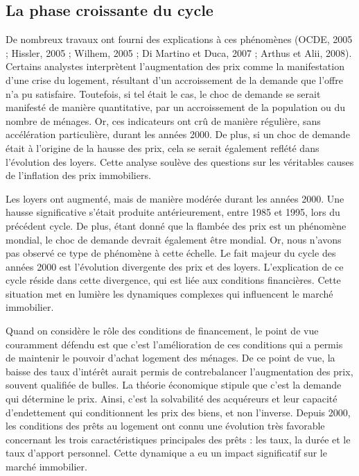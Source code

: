 \documentclass[a4paper, 12pt]{report}
\begin{document}
\subsection{La phase croissante du cycle}

De nombreux travaux ont fourni des explications à ces phénomènes (OCDE, 2005 ; Hissler, 2005 ; Wilhem, 2005 ; Di Martino et Duca, 2007 ; Arthus et Alii, 2008). Certains analystes interprètent l'augmentation des prix comme la manifestation d'une crise du logement, résultant d'un accroissement de la demande que l'offre n'a pu satisfaire. Toutefois, si tel était le cas, le choc de demande se serait manifesté de manière quantitative, par un accroissement de la population ou du nombre de ménages. Or, ces indicateurs ont crû de manière régulière, sans accélération particulière, durant les années 2000. De plus, si un choc de demande était à l'origine de la hausse des prix, cela se serait également reflété dans l'évolution des loyers. Cette analyse soulève des questions sur les véritables causes de l'inflation des prix immobiliers.

Les loyers ont augmenté, mais de manière modérée durant les années 2000. Une hausse significative s'était produite antérieurement, entre 1985 et 1995, lors du précédent cycle. De plus, étant donné que la flambée des prix est un phénomène mondial, le choc de demande devrait également être mondial. Or, nous n'avons pas observé ce type de phénomène à cette échelle. Le fait majeur du cycle des années 2000 est l'évolution divergente des prix et des loyers. L'explication de ce cycle réside dans cette divergence, qui est liée aux conditions financières. Cette situation met en lumière les dynamiques complexes qui influencent le marché immobilier.

Quand on considère le rôle des conditions de financement, le point de vue couramment défendu est que c'est l'amélioration de ces conditions qui a permis de maintenir le pouvoir d'achat logement des ménages. De ce point de vue, la baisse des taux d'intérêt aurait permis de contrebalancer l'augmentation des prix, souvent qualifiée de bulles. La théorie économique stipule que c'est la demande qui détermine le prix. Ainsi, c'est la solvabilité des acquéreurs et leur capacité d'endettement qui conditionnent les prix des biens, et non l'inverse. Depuis 2000, les conditions des prêts au logement ont connu une évolution très favorable concernant les trois caractéristiques principales des prêts : les taux, la durée et le taux d'apport personnel. Cette dynamique a eu un impact significatif sur le marché immobilier.
\end{document}
